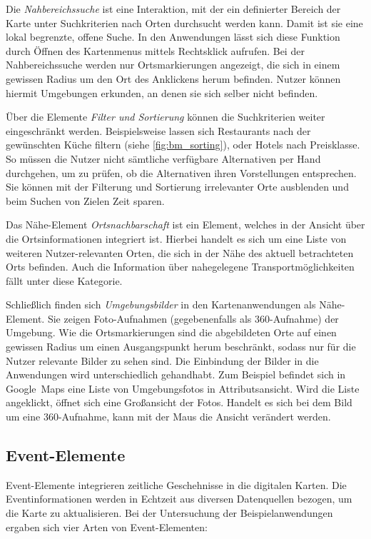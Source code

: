 Die \emph{Nahbereichssuche} ist eine Interaktion, mit der ein definierter Bereich der Karte unter Suchkriterien nach Orten durchsucht werden kann.
Damit ist sie eine lokal begrenzte, offene Suche.
In den Anwendungen lässt sich diese Funktion durch Öffnen des Kartenmenus mittels Rechtsklick aufrufen.
Bei der Nahbereichssuche werden nur Ortsmarkierungen angezeigt, die sich in einem gewissen Radius um den Ort des Anklickens herum befinden.
Nutzer können hiermit Umgebungen erkunden, an denen sie sich selber nicht befinden.

Über die Elemente \emph{Filter und Sortierung} können die Suchkriterien weiter eingeschränkt werden.
Beispielsweise lassen sich Restaurants nach der gewünschten Küche filtern (siehe \autoref{fig:bm_sorting}), oder Hotels nach Preisklasse.
So müssen die Nutzer nicht sämtliche verfügbare Alternativen per Hand durchgehen, um zu prüfen, ob die Alternativen ihren Vorstellungen entsprechen.
Sie können mit der Filterung und Sortierung irrelevanter Orte ausblenden und beim Suchen von Zielen Zeit sparen.

Das Nähe-Element \emph{Ortsnachbarschaft} ist ein Element, welches in der Ansicht über die Ortsinformationen integriert ist.
Hierbei handelt es sich um eine Liste von weiteren Nutzer-relevanten Orten, die sich in der Nähe des aktuell betrachteten Orts befinden.
Auch die Information über nahegelegene Transportmöglichkeiten fällt unter diese Kategorie.

Schließlich finden sich \emph{Umgebungsbilder} in den Kartenanwendungen als Nähe-Element.
Sie zeigen Foto-Aufnahmen (gegebenenfalls als 360\textdegree-Aufnahme) der Umgebung.
Wie die Ortsmarkierungen sind die abgebildeten Orte auf einen gewissen Radius um einen Ausgangspunkt herum beschränkt, sodass nur für die Nutzer relevante Bilder zu sehen sind.
Die Einbindung der Bilder in die Anwendungen wird unterschiedlich gehandhabt.
Zum Beispiel befindet sich in Google~Maps eine Liste von Umgebungsfotos in Attributsansicht.
Wird die Liste angeklickt, öffnet sich eine Großansicht der Fotos.
Handelt es sich bei dem Bild um eine 360\textdegree-Aufnahme, kann mit der Maus die Ansicht verändert werden.

\subsection{Event-Elemente}
\label{ssec:event-elements}
Event-Elemente integrieren zeitliche Geschehnisse in die digitalen Karten.
Die Eventinformationen werden in Echtzeit aus diversen Datenquellen bezogen, um die Karte zu aktualisieren.
Bei der Untersuchung der Beispielanwendungen ergaben sich vier Arten von Event-Elementen:

